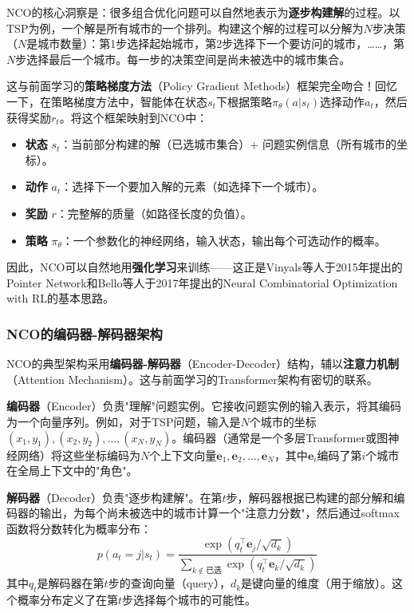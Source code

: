 \documentclass[lang=cn,zihao=-4,a4paper,fontset=windows]{beautybook}
\begin{document}
NCO的核心洞察是：很多组合优化问题可以自然地表示为\textbf{逐步构建解}的过程。以TSP为例，一个解是所有城市的一个排列。构建这个解的过程可以分解为$N$步决策（$N$是城市数量）：第1步选择起始城市，第2步选择下一个要访问的城市，……，第$N$步选择最后一个城市。每一步的决策空间是尚未被选中的城市集合。

这与前面学习的\textbf{策略梯度方法}（Policy Gradient Methods）框架完全吻合！回忆一下，在策略梯度方法中，智能体在状态$s_t$下根据策略$\pi_\theta(a|s_t)$选择动作$a_t$，然后获得奖励$r_t$。将这个框架映射到NCO中：

\begin{itemize}
    \item \textbf{状态} $s_t$：当前部分构建的解（已选城市集合）+ 问题实例信息（所有城市的坐标）。
    \item \textbf{动作} $a_t$：选择下一个要加入解的元素（如选择下一个城市）。
    \item \textbf{奖励} $r$：完整解的质量（如路径长度的负值）。
    \item \textbf{策略} $\pi_\theta$：一个参数化的神经网络，输入状态，输出每个可选动作的概率。
\end{itemize}

因此，NCO可以自然地用\textbf{强化学习}来训练——这正是Vinyals等人于2015年提出的Pointer Network和Bello等人于2017年提出的Neural Combinatorial Optimization with RL的基本思路。

\subsubsection{NCO的编码器-解码器架构}

NCO的典型架构采用\textbf{编码器-解码器}（Encoder-Decoder）结构，辅以\textbf{注意力机制}（Attention Mechanism）。这与前面学习的Transformer架构有密切的联系。

\textbf{编码器}（Encoder）负责"理解"问题实例。它接收问题实例的输入表示，将其编码为一个向量序列。例如，对于TSP问题，输入是$N$个城市的坐标$(x_1, y_1), (x_2, y_2), \dots, (x_N, y_N)$。编码器（通常是一个多层Transformer或图神经网络）将这些坐标编码为$N$个上下文向量$\mathbf{e}_1, \mathbf{e}_2, \dots, \mathbf{e}_N$，其中$\mathbf{e}_i$编码了第$i$个城市在全局上下文中的"角色"。

\textbf{解码器}（Decoder）负责"逐步构建解"。在第$t$步，解码器根据已构建的部分解和编码器的输出，为每个尚未被选中的城市计算一个"注意力分数"，然后通过softmax函数将分数转化为概率分布：
\[
p(a_t = j | s_t) = \frac{\exp(q_t^\top \mathbf{e}_j / \sqrt{d_k})}{\sum_{k \notin \text{已选}} \exp(q_t^\top \mathbf{e}_k / \sqrt{d_k})}
\]
其中$q_t$是解码器在第$t$步的查询向量（query），$d_k$是键向量的维度（用于缩放）。这个概率分布定义了在第$t$步选择每个城市的可能性。
\end{document}
